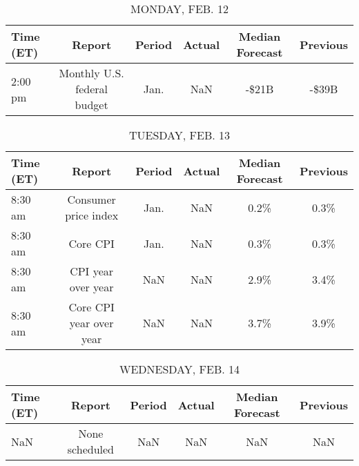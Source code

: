 \documentclass{article}%
\begin{document}
%
\normalsize%


\begin{table}[htbp]%
\caption{MONDAY, FEB. 12}%
\centering%
\begin{adjustbox}{width=1\textwidth}%
\begin{tabular}{lccccc}
\toprule
Time (ET) &                      Report & Period & Actual & Median Forecast & Previous \\
\midrule
  2:00 pm & Monthly U.S. federal budget &   Jan. &    NaN &           -\$21B &    -\$39B \\
\bottomrule
\end{tabular}
%
\end{adjustbox}%
\end{table}

%


\begin{table}[htbp]%
\caption{TUESDAY, FEB. 13}%
\centering%
\begin{adjustbox}{width=1\textwidth}%
\begin{tabular}{lccccc}
\toprule
Time (ET) &                  Report & Period & Actual & Median Forecast & Previous \\
\midrule
  8:30 am &    Consumer price index &   Jan. &    NaN &            0.2\% &     0.3\% \\
  8:30 am &                Core CPI &   Jan. &    NaN &            0.3\% &     0.3\% \\
  8:30 am &      CPI year over year &    NaN &    NaN &            2.9\% &     3.4\% \\
  8:30 am & Core CPI year over year &    NaN &    NaN &            3.7\% &     3.9\% \\
\bottomrule
\end{tabular}
%
\end{adjustbox}%
\end{table}

%


\begin{table}[htbp]%
\caption{WEDNESDAY, FEB. 14}%
\centering%
\begin{adjustbox}{width=1\textwidth}%
\begin{tabular}{lccccc}
\toprule
Time (ET) &         Report & Period & Actual & Median Forecast & Previous \\
\midrule
      NaN & None scheduled &    NaN &    NaN &             NaN &      NaN \\
\bottomrule
\end{tabular}
%
\end{adjustbox}%
\end{table}
\end{document}
